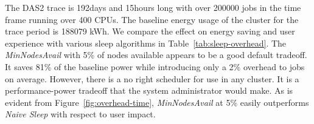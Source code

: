 
The DAS2 trace is 192days and 15hours long with over 200000 jobs in the time frame running over 400 CPUs. The baseline energy usage of the cluster for the trace period is 188079 kWh. We compare the effect on energy saving and user experience with various sleep algorithms in Table~\ref{tab:sleep-overhead}. The \emph{MinNodesAvail} with 5\% of nodes available appears to be a good default tradeoff. It saves 81\% of the baseline power while introducing only a 2\% overhead to jobs on average. However, there is a no right scheduler for use in any cluster. It is a performance-power tradeoff that the system administrator would make. As is evident from Figure~\ref{fig:overhead-time}, \emph{MinNodesAvail} at 5\% easily outperforms \emph{Naive Sleep} with respect to user impact.

